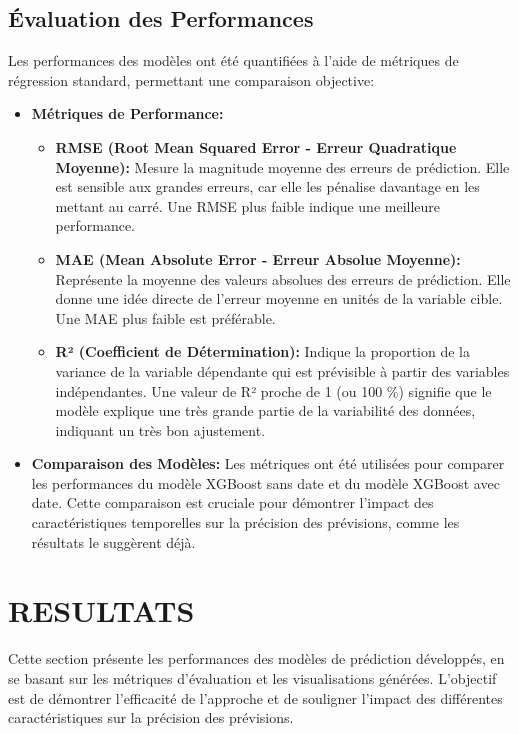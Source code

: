 \documentclass[12pt]{article}
\begin{document}
\subsection{Évaluation des Performances}
Les performances des modèles ont été quantifiées à l'aide de métriques de régression standard, permettant une comparaison objective:
\begin{itemize}[label=$\color{blue}\dagger$]
	\item \textbf{\color{blue} Métriques de Performance:}
	\begin{itemize}
		\item \textbf{RMSE (Root Mean Squared Error - Erreur Quadratique Moyenne):} Mesure la magnitude moyenne des erreurs de prédiction. Elle est sensible aux grandes erreurs, car elle les pénalise davantage en les mettant au carré. Une RMSE plus faible indique une meilleure performance.
		\item \textbf{MAE (Mean Absolute Error - Erreur Absolue Moyenne):} Représente la moyenne des valeurs absolues des erreurs de prédiction. Elle donne une idée directe de l'erreur moyenne en unités de la variable cible. Une MAE plus faible est préférable.
		\item \textbf{R² (Coefficient de Détermination):} Indique la proportion de la variance de la variable dépendante qui est prévisible à partir des variables indépendantes. Une valeur de R² proche de 1 (ou 100 \%) signifie que le modèle explique une très grande partie de la variabilité des données, indiquant un très bon ajustement.
	\end{itemize}
\item \textbf{\color{blue} Comparaison des Modèles:} Les métriques ont été utilisées pour comparer les performances du modèle XGBoost sans date et du modèle XGBoost avec date. Cette comparaison est cruciale pour démontrer l'impact des caractéristiques temporelles sur la précision des prévisions, comme les résultats le suggèrent déjà.
\end{itemize}
\section{RESULTATS}
Cette section présente les performances des modèles de prédiction développés, en se basant sur les métriques d'évaluation et les visualisations générées. L'objectif est de démontrer l'efficacité de l'approche et de souligner l'impact des différentes caractéristiques sur la précision des prévisions.
\end{document}
